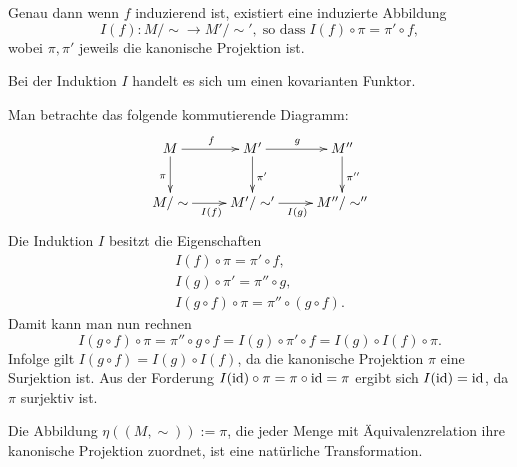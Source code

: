 Genau dann wenn $f$ induzierend ist, existiert eine induzierte
Abbildung
\[I(f)\colon M/\sim\to M'/\sim',\;\text{so dass}\;I(f)\circ\pi = \pi'\circ f,\]
wobei $\pi,\pi'$ jeweils die kanonische Projektion ist.
\begin{Satz}
Bei der Induktion $I$ handelt es sich um einen kovarianten Funktor.
\end{Satz}
 Man betrachte das folgende kommutierende Diagramm:
\[\xymatrix{
M \ar[r]^{f} \ar[d]_{\pi}
& M' \ar[r]^{g} \ar[d]^{\pi'}
& M'' \ar[d]^{\pi''}\\
M/\sim \ar[r]_{I(f)}
& M'/\sim' \ar[r]_{I(g)}
& M''/\sim''}\]
Die Induktion $I$ besitzt die Eigenschaften
\begin{gather*}
I(f)\circ\pi = \pi'\circ f,\\
I(g)\circ\pi' = \pi''\circ g,\\
I(g\circ f)\circ\pi = \pi''\circ (g\circ f).
\end{gather*}
Damit kann man nun rechnen
\begin{equation}
I(g\circ f)\circ\pi = \pi''\circ g\circ f
= I(g)\circ\pi'\circ f = I(g)\circ I(f)\circ\pi.
\end{equation}
Infolge gilt $I(g\circ f)=I(g)\circ I(f)$, da die kanonische
Projektion $\pi$ eine Surjektion ist. Aus der Forderung $I(\operatorname{id})\circ\pi
= \pi\circ\operatorname{id} = \pi$ ergibt sich $I(\operatorname{id}) = \operatorname{id}$,
da $\pi$ surjektiv ist.\;\qedsymbol

Die Abbildung $\eta((M,\sim)):=\pi$, die jeder Menge mit
Äquivalenzrelation ihre kanonische Projektion zuordnet,
ist eine natürliche Transformation.

